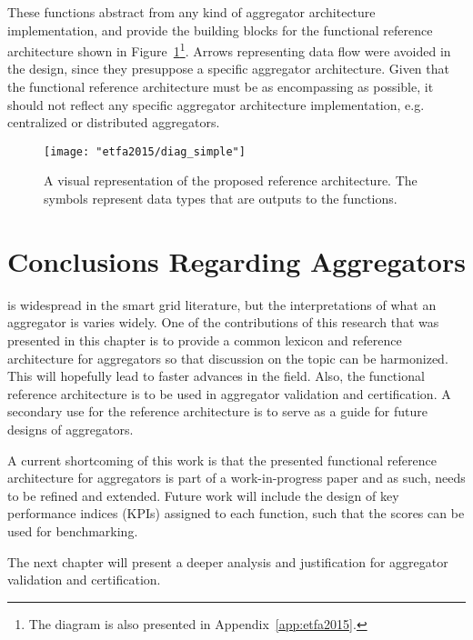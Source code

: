 These functions abstract from any kind of aggregator architecture implementation, and provide the building blocks for the functional reference architecture shown in Figure~\ref{fig:MAINrefarch}\footnote{The diagram is also presented in Appendix~\ref{app:etfa2015}.}. Arrows representing data flow were avoided in the design, since they presuppose a specific aggregator architecture. Given that the functional reference architecture must be as encompassing as possible, it should not reflect any specific aggregator architecture implementation, e.g. centralized or distributed aggregators. 
\begin{figure}[htb]
\centering
\texttt{[image: "etfa2015/diag\_simple"]}
\caption{A visual representation of the proposed reference architecture. The symbols represent data types that are outputs to the functions.}
\label{fig:MAINrefarch}
\end{figure}

\section{Conclusions Regarding Aggregators}
 is widespread in the smart grid literature, but the interpretations of what an aggregator is varies widely. One of the contributions of this research that was presented in this chapter is to provide a common lexicon and reference architecture for aggregators so that discussion on the topic can be harmonized. This will hopefully lead to faster advances in the field. Also, the functional reference architecture is to be used in aggregator validation and certification. A secondary use for the reference architecture is to serve as a guide for future designs of aggregators.

A current shortcoming of this work is that the presented functional reference architecture for aggregators is part of a work-in-progress paper and as such, needs to be refined and extended. Future work will include the design of key performance indices (KPIs) assigned to each function, such that the scores can be used for benchmarking. 

The next chapter will present a deeper analysis and justification for aggregator validation and certification.
